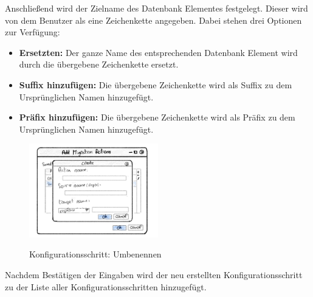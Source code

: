 Anschließend wird der Zielname des Datenbank Elementes festgelegt. Dieser wird von dem Benutzer als eine Zeichenkette angegeben. Dabei stehen drei Optionen zur Verfügung:
\begin{itemize}
	\item \textbf{Ersetzten:} Der ganze Name des entsprechenden Datenbank Element wird durch die übergebene Zeichenkette ersetzt.
	\item \textbf{Suffix hinzufügen:} Die übergebene Zeichenkette wird als Suffix zu dem Ursprünglichen Namen hinzugefügt.
	\item \textbf{Präfix hinzufügen:} Die übergebene Zeichenkette wird als Präfix zu dem Ursprünglichen Namen hinzugefügt.
\end{itemize}
\begin{figure}[H]
	\caption{Konfigurationsschritt: Umbenennen}
	\centering
	\includegraphics[width=0.5\textwidth]{images/add-rename-action}
	\label{img:add-rename-action}
\end{figure}
Nachdem Bestätigen der Eingaben wird der neu erstellten Konfigurationsschritt zu der Liste aller Konfigurationsschritten hinzugefügt.

